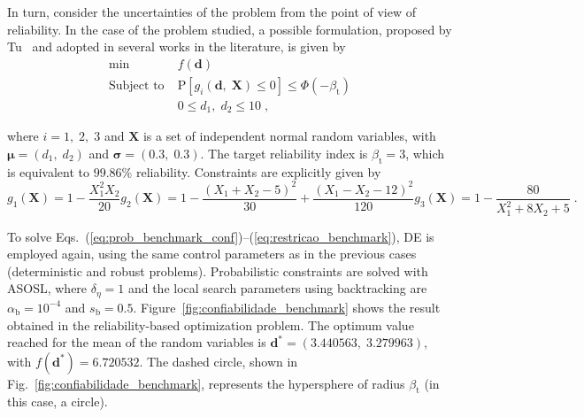 \documentclass[final,5p,times,twocolumn,numbers]{elsarticle}
\newcommand{\vect}[1]{\mathbf{\boldsymbol{#1}}}
\begin{document}
In turn, consider the uncertainties of the problem from the point of view of reliability. In the case of the problem studied, a possible formulation, proposed by Tu~\cite{bib:tu1999b} and adopted in several works in the literature, is given by
%
\begin{equation} \label{eq:prob_benchmark_conf}
\begin{split}
\min \; &f \left( \mathbf{d} \right)\\
\textrm{Subject to} \; &\mathrm{P} \left[ g_{i} \left( \mathbf{d}, \; \mathbf{X} \right) \leq 0 \right] \leq \Phi \left( -\beta_{\mathrm{t}} \right)\\
\phantom{Subject to} \; &0 \leq d_{1}, \; d_{2} \leq 10 \; ,
\end{split}
\end{equation}

\noindent where $ i = 1, \; 2, \; 3 $ and $ \mathbf{X} $ is a set of independent normal random variables, with $ \vect{\mu} = \left( d_{1}, \; d_{2} \right) $ and $ \vect{\sigma} = \left( 0.3, \; 0.3 \right) $. The target reliability index is $ \beta_{\mathrm{t}} = 3 $, which is equivalent to $ 99.86 \% $ reliability. Constraints are explicitly given by
%
\begin{subequations} \label{eq:restricao_benchmark}
\begin{equation}
g_{1} \left( \mathbf{X} \right) = 1 - \dfrac{X_{1}^{2} X_{2}}{20}
\end{equation}
%
\begin{equation}
g_{2} \left( \mathbf{X} \right) = 1 - \dfrac{\left( X_{1} + X_{2} - 5 \right)^{2}}{30} + \dfrac{\left( X_{1} - X_{2} - 12 \right)^{2}}{120}
\end{equation}
%
\begin{equation}
g_{3} \left( \mathbf{X} \right) = 1 - \dfrac{80}{X_{1}^{2} + 8 X_{2} + 5}\; .
\end{equation}
\end{subequations}

To solve Eqs.~(\ref{eq:prob_benchmark_conf})--(\ref{eq:restricao_benchmark}), DE is employed again, using the same control parameters as in the previous cases (deterministic and robust problems). Probabilistic constraints are solved with ASOSL, where $ \delta_{\eta} = 1 $ and the local search parameters using backtracking are $ \alpha_{\mathrm{b}} = 10^{-4} $ and $ s_{\mathrm{b}} = 0.5 $. Figure~\ref{fig:confiabilidade_benchmark} shows the result obtained in the reliability-based optimization problem. The optimum value reached for the mean of the random variables is $ \mathbf{d}^{*} = \left( 3.440563, \; 3.279963 \right) $, with $ f \left( \mathbf{d}^{*} \right) = 6.720532 $. The dashed circle, shown in Fig.~\ref{fig:confiabilidade_benchmark}, represents the hypersphere of radius $ \beta_{\mathrm{t}} $ (in this case, a circle).
\end{document}
